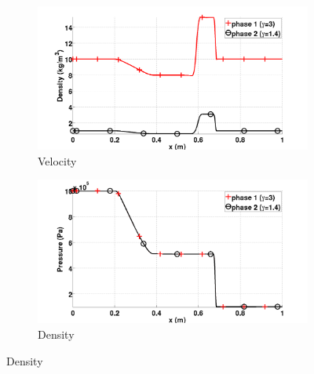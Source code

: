 \documentclass[preprint,10pt]{elsarticle}
\begin{document}
\begin{figure}[H]
        \centering
        \begin{subfigure}[b]{0.495\textwidth}
                \centering
                \includegraphics[width=\textwidth]{figures/relaxation_two_phases_density.png}
                \caption{Velocity}
                \label{fig:inf-rel-vel}
        \end{subfigure}%
        \begin{subfigure}[b]{0.495\textwidth}
                \centering
                \includegraphics[width=\textwidth]{figures/relaxation_two_phases_pressure.png}
                \caption{Density}
                \label{fig:inf-rel-density}
        \end{subfigure}
        

\end{figure}
\end{document}
